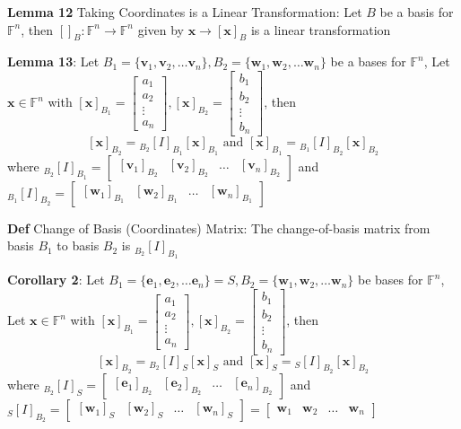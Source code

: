 \documentclass[11pt,notitlepage]{report}
\newcommand{\bb}[1]{\ensuremath{\mathbb{#1}}}
\newcommand{\tbf}[1]{\textbf{#1}}
\begin{document}
\textbf{Lemma 12} Taking Coordinates is a Linear Transformation: Let $B$ be a basis for $\bb F^n$, then $[]_B: \bb F^n \to \bb F^n$ given by $\tbf x \to [\tbf x]_B$ is a linear transformation

\textbf{Lemma 13}: Let $B_1 = \{\tbf v_1, \tbf v_2, \dots \tbf v_n\}, B_2 = \{\tbf w_1, \tbf w_2, \dots \tbf w_n\}$ be a bases for $\bb F^n$, Let $\tbf x \in \bb F^n$ with $[\tbf x]_{B_1} = \begin{bmatrix}
a_1\\a_2\\ \vdots \\ a_n
\end{bmatrix}, [\tbf x]_{B_2} = \begin{bmatrix}
b_1\\b_2\\ \vdots \\ b_n
\end{bmatrix}$, then $$[\tbf x]_{B_2} = {}_{B_2}[I]_{B_1} [\tbf x]_{B_1} \text{ and } [\tbf x]_{B_1} = {}_{B_1}[I]_{B_2} [\tbf x]_{B_2}$$
where ${}_{B_2}[I]_{B_1} = \begin{bmatrix}
[\tbf v_1]_{B_2} & [\tbf v_2]_{B_2} & \dots & [\tbf v_n]_{B_2}
\end{bmatrix}$ and ${}_{B_1}[I]_{B_2} = \begin{bmatrix}
[\tbf w_1]_{B_1} & [\tbf w_2]_{B_1} & \dots & [\tbf w_n]_{B_1}
\end{bmatrix}$

\textbf{Def} Change of Basis (Coordinates) Matrix: The change-of-basis matrix from basis $B_1$ to basis $B_2$ is ${}_{B_2}[I]_{B_1}$

\textbf{Corollary 2}: Let $B_1 = \{\tbf e_1, \tbf e_2, \dots \tbf e_n\} = S, B_2 = \{\tbf w_1, \tbf w_2, \dots \tbf w_n\}$ be bases for $\bb F^n$, Let $\tbf x \in \bb F^n$ with $[\tbf x]_{B_1} = \begin{bmatrix}
a_1\\a_2\\ \vdots \\ a_n
\end{bmatrix}, [\tbf x]_{B_2} = \begin{bmatrix}
b_1\\b_2\\ \vdots \\ b_n
\end{bmatrix}$, then $$[\tbf x]_{B_2} = {}_{B_2}[I]_{S} [\tbf x]_{S} \text{ and } [\tbf x]_{S} = {}_{S}[I]_{B_2} [\tbf x]_{B_2}$$
where ${}_{B_2}[I]_{S} = \begin{bmatrix}
[\tbf e_1]_{B_2} & [\tbf e_2]_{B_2} & \dots & [\tbf e_n]_{B_2}
\end{bmatrix}$ and ${}_{S}[I]_{B_2} = \begin{bmatrix}
[\tbf w_1]_{S} & [\tbf w_2]_{S} & \dots & [\tbf w_n]_{S}
\end{bmatrix} = \begin{bmatrix}
\tbf w_1 & \tbf w_2 & \dots & \tbf w_n
\end{bmatrix}$
\end{document}
